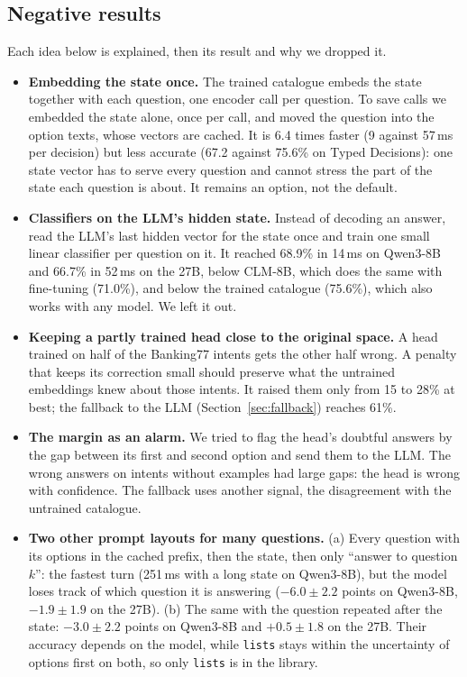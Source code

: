 \documentclass[11pt]{article}
\newcommand{\ms}{\,ms}
\begin{document}
\subsection{Negative results}\label{sec:negative}
Each idea below is explained, then its result and why we dropped it.
\begin{itemize}
\item \textbf{Embedding the state once.} The trained catalogue embeds the state together with each question, one
encoder call per question. To save calls we embedded the state alone, once per call, and moved the question into the
option texts, whose vectors are cached. It is 6.4 times faster (9 against 57\ms{} per decision) but less accurate
(67.2 against 75.6\% on Typed Decisions): one state vector has to serve every question and cannot stress the part of
the state each question is about. It remains an option, not the default.
\item \textbf{Classifiers on the LLM's hidden state.} Instead of decoding an answer, read the LLM's last hidden vector
for the state once and train one small linear classifier per question on it. It reached 68.9\% in 14\ms{} on
Qwen3-8B and 66.7\% in 52\ms{} on the 27B, below CLM-8B, which does the same with fine-tuning (71.0\%), and below the
trained catalogue (75.6\%), which also works with any model. We left it out.
\item \textbf{Keeping a partly trained head close to the original space.} A head trained on half of the Banking77
intents gets the other half wrong. A penalty that keeps its correction small should preserve what the untrained
embeddings knew about those intents. It raised them only from 15 to 28\% at best; the fallback to the LLM
(Section~\ref{sec:fallback}) reaches 61\%.
\item \textbf{The margin as an alarm.} We tried to flag the head's doubtful answers by the gap between its first and
second option and send them to the LLM. The wrong answers on intents without examples had large gaps: the head is
wrong with confidence. The fallback uses another signal, the disagreement with the untrained catalogue.
\item \textbf{Two other prompt layouts for many questions.} (a) Every question with its options in the cached prefix,
then the state, then only ``answer to question $k$'': the fastest turn (251\ms{} with a long state on Qwen3-8B), but
the model loses track of which question it is answering ($-6.0\pm2.2$ points on Qwen3-8B, $-1.9\pm1.9$ on the 27B).
(b) The same with the question repeated after the state: $-3.0\pm2.2$ points on Qwen3-8B and $+0.5\pm1.8$ on the 27B.
Their accuracy depends on the model, while \texttt{lists} stays within the uncertainty of options first on both, so
only \texttt{lists} is in the library.
\end{itemize}
\end{document}
